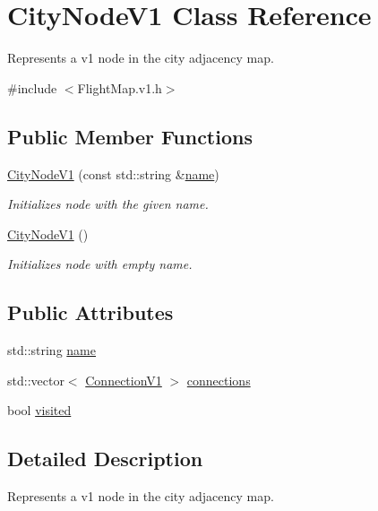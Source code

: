\hypertarget{class_city_node_v1}{}\section{City\+Node\+V1 Class Reference}
\label{class_city_node_v1}


Represents a v1 node in the city adjacency map.  




{\ttfamily \#include $<$Flight\+Map.\+v1.\+h$>$}

\subsection*{Public Member Functions}
\begin{DoxyCompactItemize}
\item 
\hyperlink{class_city_node_v1_abbbcf07a0ef873b9cd4a7c4acc904bfa}{City\+Node\+V1} (const std\+::string \&\hyperlink{class_city_node_v1_aadf0c50a4e35c15a8e13b51afefbdbc5}{name})
\begin{DoxyCompactList}\small\item\em Initializes node with the given name. \end{DoxyCompactList}\item 
\hyperlink{class_city_node_v1_a422f2c8818000e84e4eea3e2ab4028aa}{City\+Node\+V1} ()
\begin{DoxyCompactList}\small\item\em Initializes node with empty name. \end{DoxyCompactList}\end{DoxyCompactItemize}
\subsection*{Public Attributes}
\begin{DoxyCompactItemize}
\item 
std\+::string \hyperlink{class_city_node_v1_aadf0c50a4e35c15a8e13b51afefbdbc5}{name}
\item 
std\+::vector$<$ \hyperlink{struct_connection_v1}{Connection\+V1} $>$ \hyperlink{class_city_node_v1_a32793af0a49d5a187d88a1633f53b5c4}{connections}
\item 
bool \hyperlink{class_city_node_v1_adc01d952c831f5f740674e06940c4844}{visited}
\end{DoxyCompactItemize}


\subsection{Detailed Description}
Represents a v1 node in the city adjacency map. 

